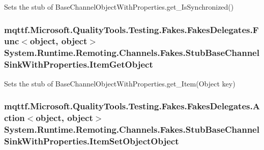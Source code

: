Sets the stub of Base\-Channel\-Object\-With\-Properties.\-get\-\_\-\-Is\-Synchronized()

\hypertarget{class_system_1_1_runtime_1_1_remoting_1_1_channels_1_1_fakes_1_1_stub_base_channel_sink_with_properties_a60a89ff48b43120a06b64d6617865fa9}{
\subsubsection[{Item\-Get\-Object}]{\setlength{\rightskip}{0pt plus 5cm}mqttf.\-Microsoft.\-Quality\-Tools.\-Testing.\-Fakes.\-Fakes\-Delegates.\-Func$<$object, object$>$ System.\-Runtime.\-Remoting.\-Channels.\-Fakes.\-Stub\-Base\-Channel\-Sink\-With\-Properties.\-Item\-Get\-Object}}\label{class_system_1_1_runtime_1_1_remoting_1_1_channels_1_1_fakes_1_1_stub_base_channel_sink_with_properties_a60a89ff48b43120a06b64d6617865fa9}


Sets the stub of Base\-Channel\-Object\-With\-Properties.\-get\-\_\-\-Item(\-Object key)

\hypertarget{class_system_1_1_runtime_1_1_remoting_1_1_channels_1_1_fakes_1_1_stub_base_channel_sink_with_properties_a580d35416dd3113e60a486f2ea2823d5}{
\subsubsection[{Item\-Set\-Object\-Object}]{\setlength{\rightskip}{0pt plus 5cm}mqttf.\-Microsoft.\-Quality\-Tools.\-Testing.\-Fakes.\-Fakes\-Delegates.\-Action$<$object, object$>$ System.\-Runtime.\-Remoting.\-Channels.\-Fakes.\-Stub\-Base\-Channel\-Sink\-With\-Properties.\-Item\-Set\-Object\-Object}}\label{class_system_1_1_runtime_1_1_remoting_1_1_channels_1_1_fakes_1_1_stub_base_channel_sink_with_properties_a580d35416dd3113e60a486f2ea2823d5}



